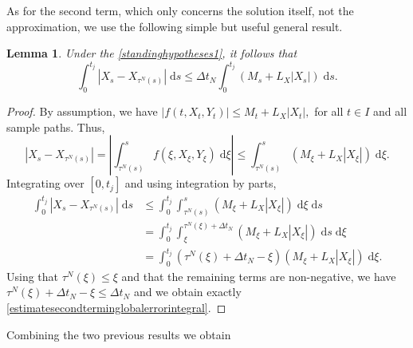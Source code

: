\documentclass[reqno,12pt]{amsart}
\theoremstyle{plain}%
\newtheorem{lem}{Lemma}[section]
\theoremstyle{definition}
\begin{document}
As for the second term, which only concerns the solution itself, not the approximation, we use the following simple but useful general result.

\begin{lem}
    \label{estimatesecondterminglobalerror}
    Under the \cref{standinghypotheses1}, it follows that
    \begin{equation}
        \label{estimatesecondterminglobalerrorintegral}
        \int_0^{t_j}\left|X_s - X_{\tau^N(s)}\right| \;\mathrm{d}s \leq \Delta t_N \int_0^{t_j} (M_s + L_X|X_s|) \;\mathrm{d}s.
    \end{equation}
\end{lem}

\begin{proof}
    By assumption, we have $|f(t, X_t, Y_t)| \leq M_t + L_X|X_t|,$ for all $t\in I$ and all sample paths. Thus,
    \[
      \left|X_s - X_{\tau^N(s)}\right| = \left|\int_{\tau^N(s)}^s f(\xi, X_\xi, Y_\xi)\;\mathrm{d}\xi\right| \leq \int_{\tau^N(s)}^s (M_\xi + L_X|X_\xi|)\;\mathrm{d}\xi.
    \]
    Integrating over $[0, t_j]$ and using integration by parts,
    \begin{align*}
        \int_0^{t_j}\left|X_s - X_{\tau^N(s)}\right| \;\mathrm{d}s & \leq \int_0^{t_j}\int_{\tau^N(s)}^s (M_\xi + L_X|X_\xi|) \;\mathrm{d}\xi \;\mathrm{d}s \\
        & = \int_0^{t_j}\int_\xi^{\tau^N(\xi) + \Delta t_N} (M_\xi + L_X|X_\xi|) \;\mathrm{d}s \;\mathrm{d}\xi \\
        & =  \int_0^{t_j} (\tau^N(\xi) + \Delta t_N - \xi) (M_\xi + L_X|X_\xi|) \;\mathrm{d}\xi.
    \end{align*}
    Using that $\tau^N(\xi) \leq \xi$ and that the remaining terms are non-negative, we have $\tau^N(\xi) + \Delta t_N - \xi \leq \Delta t_N$ and we obtain exactly \eqref{estimatesecondterminglobalerrorintegral}.
\end{proof}

Combining the two previous results we obtain
\end{document}
